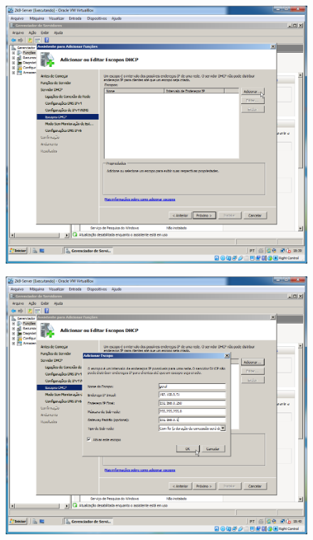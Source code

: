 \documentclass[10pt]{article}
\begin{document}
\begin{figure}[H]
    \centering
    \caption{}
    \label{fig:5315}
    \includegraphics[width=\linewidth]{images/windows_server/dhcp/011.png}
\end{figure}
\begin{figure}[H]
    \centering
    \caption{}
    \label{fig:5316}
    \includegraphics[width=\linewidth]{images/windows_server/dhcp/012.png}
\end{figure}
\end{document}
